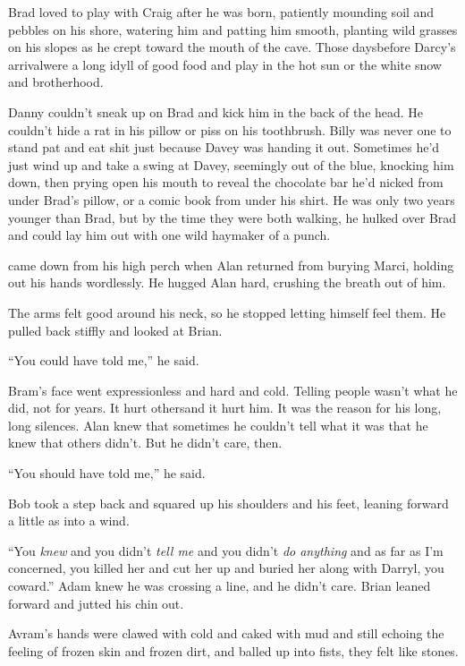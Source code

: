 Brad loved to play with Craig after he was born, patiently mounding
soil and pebbles on his shore, watering him and patting him smooth,
planting wild grasses on his slopes as he crept toward the mouth of
the cave.  Those days\dash{}before Darcy's arrival\dash{}were a long idyll of
good food and play in the hot sun or the white snow and brotherhood.

Danny couldn't sneak up on Brad and kick him in the back of the head. 
He couldn't hide a rat in his pillow or piss on his toothbrush.  Billy
was never one to stand pat and eat shit just because Davey was handing
it out.  Sometimes he'd just wind up and take a swing at Davey,
seemingly out of the blue, knocking him down, then prying open his
mouth to reveal the chocolate bar he'd nicked from under Brad's
pillow, or a comic book from under his shirt.  He was only two years
younger than Brad, but by the time they were both walking, he hulked
over Brad and could lay him out with one wild haymaker of a punch.

 came down from his high perch when Alan returned from burying
Marci, holding out his hands wordlessly.  He hugged Alan hard,
crushing the breath out of him.

The arms felt good around his neck, so he stopped letting himself feel
them.  He pulled back stiffly and looked at Brian.

``You could have told me,'' he said.

Bram's face went expressionless and hard and cold.  Telling people
wasn't what he did, not for years.  It hurt others\dash{}and it hurt him. 
It was the reason for his long, long silences.  Alan knew that
sometimes he couldn't tell what it was that he knew that others
didn't.  But he didn't care, then.

``You should have told me,'' he said.

Bob took a step back and squared up his shoulders and his feet,
leaning forward a little as into a wind.

``You \textit{knew} and you didn't \textit{tell me} and you didn't
\textit{do anything} and as far as I'm concerned, you killed her and
cut her up and buried her along with Darryl, you coward.'' Adam knew
he was crossing a line, and he didn't care.  Brian leaned forward and
jutted his chin out.

Avram's hands were clawed with cold and caked with mud and still
echoing the feeling of frozen skin and frozen dirt, and balled up into
fists, they felt like stones.

